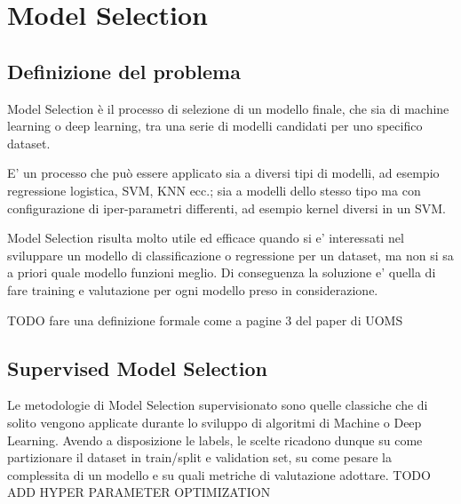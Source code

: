\chapter{Model Selection}

\section{Definizione del problema}
Model Selection è il processo di selezione di un modello finale, che sia di machine learning o deep learning, tra una serie di modelli candidati per uno specifico dataset.

E' un processo che può essere applicato sia a diversi tipi di modelli, ad esempio regressione logistica, SVM, KNN ecc.; sia a modelli dello stesso tipo ma con configurazione di iper-parametri differenti, ad esempio kernel diversi in un SVM.

Model Selection risulta molto utile ed efficace quando si e' interessati nel sviluppare un modello di classificazione o regressione per un dataset, ma non si sa a priori quale modello funzioni meglio. Di conseguenza la soluzione e' quella di fare training e valutazione per ogni modello preso in considerazione.

TODO fare una definizione formale come a pagine 3 del paper di UOMS

\section{Supervised Model Selection}
Le metodologie di Model Selection supervisionato sono quelle classiche che di solito vengono applicate durante lo sviluppo di algoritmi di Machine o Deep Learning. Avendo a disposizione le labels, le scelte ricadono dunque su come partizionare il dataset in train/split e validation set, su come pesare la complessita di un modello e su quali metriche di valutazione adottare.
TODO ADD HYPER PARAMETER OPTIMIZATION
